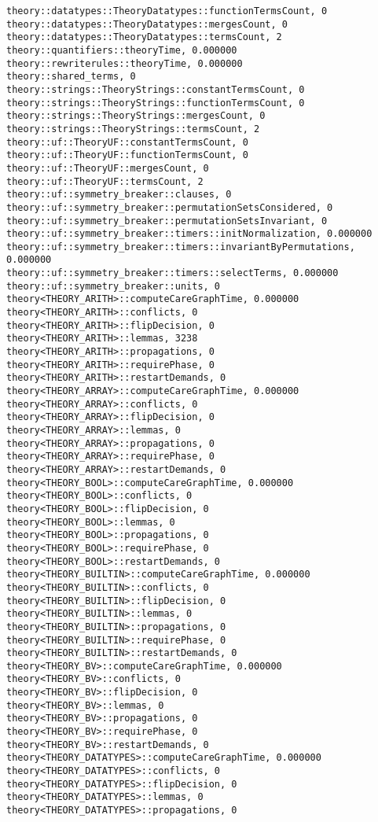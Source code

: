 \begin{lstlisting}
theory::datatypes::TheoryDatatypes::functionTermsCount, 0
theory::datatypes::TheoryDatatypes::mergesCount, 0
theory::datatypes::TheoryDatatypes::termsCount, 2
theory::quantifiers::theoryTime, 0.000000
theory::rewriterules::theoryTime, 0.000000
theory::shared_terms, 0
theory::strings::TheoryStrings::constantTermsCount, 0
theory::strings::TheoryStrings::functionTermsCount, 0
theory::strings::TheoryStrings::mergesCount, 0
theory::strings::TheoryStrings::termsCount, 2
theory::uf::TheoryUF::constantTermsCount, 0
theory::uf::TheoryUF::functionTermsCount, 0
theory::uf::TheoryUF::mergesCount, 0
theory::uf::TheoryUF::termsCount, 2
theory::uf::symmetry_breaker::clauses, 0
theory::uf::symmetry_breaker::permutationSetsConsidered, 0
theory::uf::symmetry_breaker::permutationSetsInvariant, 0
theory::uf::symmetry_breaker::timers::initNormalization, 0.000000
theory::uf::symmetry_breaker::timers::invariantByPermutations, 0.000000
theory::uf::symmetry_breaker::timers::selectTerms, 0.000000
theory::uf::symmetry_breaker::units, 0
theory<THEORY_ARITH>::computeCareGraphTime, 0.000000
theory<THEORY_ARITH>::conflicts, 0
theory<THEORY_ARITH>::flipDecision, 0
theory<THEORY_ARITH>::lemmas, 3238
theory<THEORY_ARITH>::propagations, 0
theory<THEORY_ARITH>::requirePhase, 0
theory<THEORY_ARITH>::restartDemands, 0
theory<THEORY_ARRAY>::computeCareGraphTime, 0.000000
theory<THEORY_ARRAY>::conflicts, 0
theory<THEORY_ARRAY>::flipDecision, 0
theory<THEORY_ARRAY>::lemmas, 0
theory<THEORY_ARRAY>::propagations, 0
theory<THEORY_ARRAY>::requirePhase, 0
theory<THEORY_ARRAY>::restartDemands, 0
theory<THEORY_BOOL>::computeCareGraphTime, 0.000000
theory<THEORY_BOOL>::conflicts, 0
theory<THEORY_BOOL>::flipDecision, 0
theory<THEORY_BOOL>::lemmas, 0
theory<THEORY_BOOL>::propagations, 0
theory<THEORY_BOOL>::requirePhase, 0
theory<THEORY_BOOL>::restartDemands, 0
theory<THEORY_BUILTIN>::computeCareGraphTime, 0.000000
theory<THEORY_BUILTIN>::conflicts, 0
theory<THEORY_BUILTIN>::flipDecision, 0
theory<THEORY_BUILTIN>::lemmas, 0
theory<THEORY_BUILTIN>::propagations, 0
theory<THEORY_BUILTIN>::requirePhase, 0
theory<THEORY_BUILTIN>::restartDemands, 0
theory<THEORY_BV>::computeCareGraphTime, 0.000000
theory<THEORY_BV>::conflicts, 0
theory<THEORY_BV>::flipDecision, 0
theory<THEORY_BV>::lemmas, 0
theory<THEORY_BV>::propagations, 0
theory<THEORY_BV>::requirePhase, 0
theory<THEORY_BV>::restartDemands, 0
theory<THEORY_DATATYPES>::computeCareGraphTime, 0.000000
theory<THEORY_DATATYPES>::conflicts, 0
theory<THEORY_DATATYPES>::flipDecision, 0
theory<THEORY_DATATYPES>::lemmas, 0
theory<THEORY_DATATYPES>::propagations, 0

\end{lstlisting}

